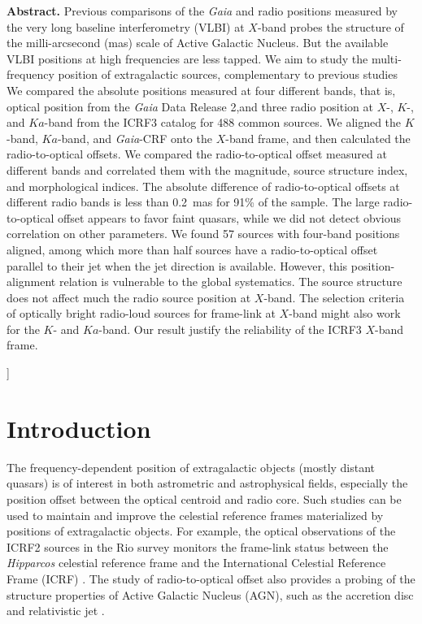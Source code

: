 \documentclass{aa-note}   %
\begin{document}
{\begin{center}
\begin{minipage}[t]{15cm}
  {\bf Abstract.}
  Previous comparisons of the \textit{Gaia} and radio positions measured by the very long baseline interferometry (VLBI) at $X$-band probes the structure of the milli-arcsecond (mas) scale of Active Galactic Nucleus.
  But the available VLBI positions at high frequencies are less tapped.
  We aim to study the multi-frequency position of extragalactic sources, complementary to previous studies
  We compared the absolute positions measured at four different bands, 
  that is, optical position from the {\it Gaia} Data Release 2,and three radio position at $X$-, $K$-, and $Ka$-band from the ICRF3 catalog for 488 common sources.
  We aligned the $K$-band, $Ka$-band, and \textit{Gaia}-CRF onto the $X$-band frame, and then calculated the radio-to-optical offsets.
  We compared the radio-to-optical offset measured at different bands and correlated them with the magnitude, source structure index, and morphological indices.
  The absolute difference of radio-to-optical offsets at different radio bands is less than 0.2~mas for 91\% of the sample.
  The large radio-to-optical offset appears to favor faint quasars, while we did not detect obvious correlation on other parameters. 
  We found 57 sources with four-band positions aligned, among which more than half sources have a radio-to-optical offset parallel to their jet when the jet direction is available.
  However, this position-alignment relation is vulnerable to the global systematics.
  The source structure does not affect much the radio source position at $X$-band.
  The selection criteria of optically bright radio-loud sources for frame-link at $X$-band might also work for the $K$- and $Ka$-band.
  Our result justify the reliability of the ICRF3 $X$-band frame.
  \vspace*{2ex}
  \end{minipage}
\end{center}
}] 


\section{Introduction}     \label{sec:introduction}

The frequency-dependent position of extragalactic objects (mostly distant quasars) is of interest in both astrometric and astrophysical fields, especially the position offset between the optical centroid and radio core.
Such studies can be used to maintain and improve the celestial reference frames materialized by positions of extragalactic objects. 
For example, the optical observations of the ICRF2 sources in the Rio survey monitors the frame-link status between the \textit{Hipparcos} celestial reference frame and the International Celestial Reference Frame (ICRF) \citep{2013MNRAS.430.2797A}.
The study of radio-to-optical offset also provides a probing of the structure properties of Active Galactic Nucleus (AGN), such as the accretion disc and relativistic jet \citep[e.g.,][]{2019ApJ...871..143P}. 
\end{document}
